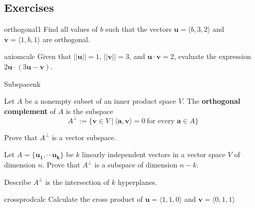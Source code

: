 \subsection{Exercises}

\begin{problem}{orthogonal1}
     Find all values of $b$ such that the vectors $\bm{u} = \langle b,3,2\rangle$ and $\bm{v} = \langle 1,b,1\rangle$ are orthogonal.
\end{problem}

\begin{problem}{axiomcalc}
    Given that $||\bm{u}|| = 1$, $||\bm{v}|| = 3$, and $\bm{u} \cdot \bm{v} = 2$, evaluate the expression $2\bm{u} \cdot (3\bm{u} - \bm{v})$.
\end{problem}


\begin{problem}{Subspacenk}
    \begin{definition}
    Let $A$ be a nonempty subset of an inner product space $V$.  The \textbf{orthogonal complement} of $A$ is the subspace
    $$A^\bot := \{\bm{v} \in V \ | \ \langle \bm{a}, \bm{v} \rangle = 0 \ \text{for every } \bm{a} \in A \}$$
    \end{definition}
    
    Prove that $A^\bot$ is a vector subspace.  
    
    
    Let $A = \{\bm{u_1}, \cdots \bm{u_k}\}$ be $k$ linearly independent vectors in a vector space $V$ of dimension $n$. Prove that $A^\bot$ is a subspace of dimension $n-k$.
    
    Describe $A^\bot$ is the intersection of $k$ hyperplanes.
    
\end{problem}

\begin{problem}{crossprodcalc}
    Calculate the cross product of $\bm{u} = \langle 1,1,0\rangle$ and $\bm{v} = \langle 0,1,1\rangle$
\end{problem}